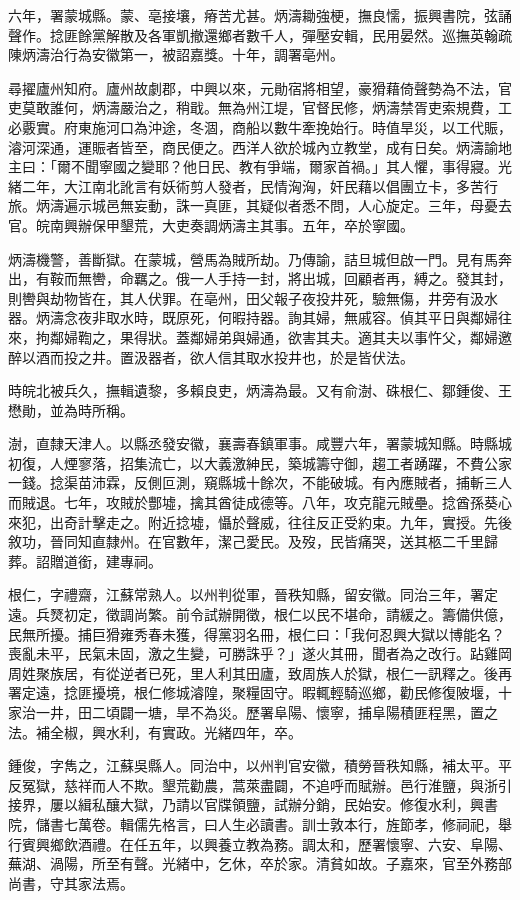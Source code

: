 \begin{pinyinscope}
六年，署蒙城縣。蒙、亳接壤，瘠苦尤甚。炳濤耡強梗，撫良懦，振興書院，弦誦聲作。捻匪餘黨解散及各軍凱撤還鄉者數千人，彈壓安輯，民用晏然。巡撫英翰疏陳炳濤治行為安徽第一，被詔嘉獎。十年，調署亳州。

尋擢廬州知府。廬州故劇郡，中興以來，元勛宿將相望，豪猾藉倚聲勢為不法，官吏莫敢誰何，炳濤嚴治之，稍戢。無為州江堤，官督民修，炳濤禁胥吏索規費，工必覈實。府東施河口為沖途，冬涸，商船以數牛牽挽始行。時值旱災，以工代賑，濬河深通，運賑者皆至，商民便之。西洋人欲於城內立教堂，成有日矣。炳濤諭地主曰：「爾不聞寧國之變耶？他日民、教有爭端，爾家首禍。」其人懼，事得寢。光緒二年，大江南北訛言有妖術剪人發者，民情洶洶，奸民藉以倡團立卡，多苦行旅。炳濤遍示城邑無妄動，誅一真匪，其疑似者悉不問，人心旋定。三年，母憂去官。皖南興辦保甲墾荒，大吏奏調炳濤主其事。五年，卒於寧國。

炳濤機警，善斷獄。在蒙城，營馬為賊所劫。乃傳諭，詰旦城但啟一門。見有馬奔出，有鞍而無轡，命羈之。俄一人手持一封，將出城，回顧者再，縛之。發其封，則轡與劫物皆在，其人伏罪。在亳州，田父報子夜投井死，驗無傷，井旁有汲水器。炳濤念夜非取水時，既原死，何暇持器。詢其婦，無戚容。偵其平日與鄰婦往來，拘鄰婦鞫之，果得狀。蓋鄰婦弟與婦通，欲害其夫。適其夫以事忤父，鄰婦邀醉以酒而投之井。置汲器者，欲人信其取水投井也，於是皆伏法。

時皖北被兵久，撫輯遺黎，多賴良吏，炳濤為最。又有俞澍、硃根仁、鄒鍾俊、王懋勛，並為時所稱。

澍，直隸天津人。以縣丞發安徽，襄壽春鎮軍事。咸豐六年，署蒙城知縣。時縣城初復，人煙寥落，招集流亡，以大義激紳民，築城籌守御，趨工者踴躍，不費公家一錢。捻渠苗沛霖，反側叵測，窺縣城十餘次，不能破城。有內應賊者，捕斬三人而賊退。七年，攻賊於酆墟，擒其酋徒成德等。八年，攻克龍元賊壘。捻酋孫葵心來犯，出奇計擊走之。附近捻墟，懾於聲威，往往反正受約束。九年，實授。先後敘功，晉同知直隸州。在官數年，潔己愛民。及歿，民皆痛哭，送其柩二千里歸葬。詔贈道銜，建專祠。

根仁，字禮齋，江蘇常熟人。以州判從軍，晉秩知縣，留安徽。同治三年，署定遠。兵燹初定，徵調尚繁。前令試辦開徵，根仁以民不堪命，請緩之。籌備供億，民無所擾。捕巨猾雍秀春未獲，得黨羽名冊，根仁曰：「我何忍興大獄以博能名？喪亂未平，民氣未固，激之生變，可勝誅乎？」遂火其冊，聞者為之改行。跕雞岡周姓聚族居，有從逆者已死，里人利其田廬，致周族人於獄，根仁一訊釋之。後再署定遠，捻匪擾境，根仁修城濬隍，聚糧固守。暇輒輕騎巡鄉，勸民修復陂堰，十家治一井，田二頃闢一塘，旱不為災。歷署阜陽、懷寧，捕阜陽積匪程黑，置之法。補全椒，興水利，有實政。光緒四年，卒。

鍾俊，字雋之，江蘇吳縣人。同治中，以州判官安徽，積勞晉秩知縣，補太平。平反冤獄，慈祥而人不欺。墾荒勸農，蒿萊盡闢，不追呼而賦辦。邑行淮鹽，與浙引接界，屢以緝私釀大獄，乃請以官牒領鹽，試辦分銷，民始安。修復水利，興書院，儲書七萬卷。輯儒先格言，曰人生必讀書。訓士敦本行，旌節孝，修祠祀，舉行賓興鄉飲酒禮。在任五年，以興養立教為務。調太和，歷署懷寧、六安、阜陽、蕪湖、渦陽，所至有聲。光緒中，乞休，卒於家。清貧如故。子嘉來，官至外務部尚書，守其家法焉。


\end{pinyinscope}
